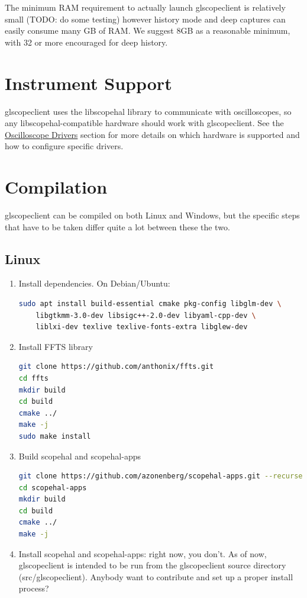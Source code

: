 The minimum RAM requirement to actually launch glscopeclient is relatively small (TODO: do some testing) however
history mode and deep captures can easily consume many GB of RAM. We suggest 8GB as a reasonable minimum, with 32 or
more encouraged for deep history.

\section{Instrument Support}

glscopeclient uses the libscopehal library to communicate with oscilloscopes, so any libscopehal-compatible hardware
should work with glscopeclient. See the \hyperref[sec:drivers]{Oscilloscope Drivers} section for more details on which
hardware is supported and how to configure specific drivers.

\section{Compilation}

glscopeclient can be compiled on both Linux and Windows, but the specific steps that have to be taken differ quite a lot between these the two.

\subsection{Linux}
\begin{enumerate}

\item Install dependencies. On Debian/Ubuntu:
\begin{lstlisting}[language=sh]
sudo apt install build-essential cmake pkg-config libglm-dev \
	libgtkmm-3.0-dev libsigc++-2.0-dev libyaml-cpp-dev \
	liblxi-dev texlive texlive-fonts-extra libglew-dev
\end{lstlisting}

\item Install FFTS library
\begin{lstlisting}[language=sh]
git clone https://github.com/anthonix/ffts.git
cd ffts
mkdir build
cd build
cmake ../
make -j
sudo make install
\end{lstlisting}

\item Build scopehal and scopehal-apps
\begin{lstlisting}[language=sh]
git clone https://github.com/azonenberg/scopehal-apps.git --recurse-submodules
cd scopehal-apps
mkdir build
cd build
cmake ../
make -j
\end{lstlisting}

\item Install scopehal and scopehal-apps: right now, you don't. As of now, glscopeclient is intended to be run from the
glscopeclient source directory (src/glscopeclient). Anybody want to contribute and set up a proper install process?

\end{enumerate}

